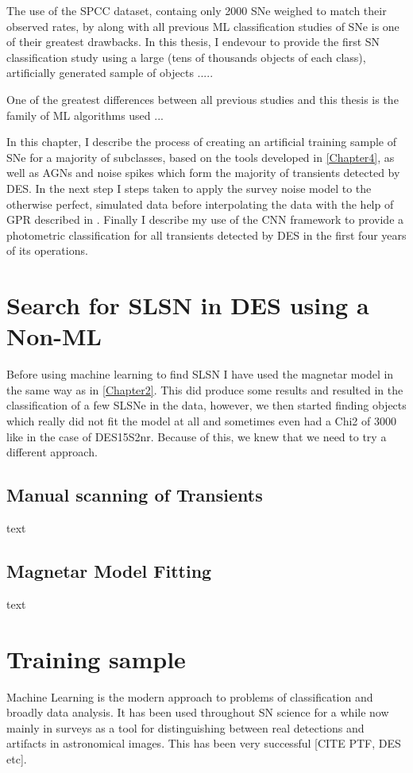 The use of the SPCC dataset, containg only 2000 SNe weighed to match their observed rates, by \citet{Lochner2016} along with all previous ML classification studies of SNe is one of their greatest drawbacks. In this thesis, I endevour to provide the first SN classification study using a large (tens of thousands objects of each class), artificially generated sample of objects .....

One of the greatest differences between all previous studies and this thesis is the family of ML algorithms used ...


In this chapter, I describe the process of creating an artificial training sample of SNe for a majority of subclasses, based on the tools developed in \cref{Chapter4}, as well as AGNs and noise spikes which form the majority of transients detected by DES. In the next step I steps taken to apply the survey noise model to the otherwise perfect, simulated data before interpolating the data with the help of GPR described in . Finally I describe my use of the CNN framework to provide a photometric classification for all transients detected by DES in the first four years of its operations.


\section{Search for SLSN in DES using a Non-ML}
Before using machine learning to find SLSN I have used the magnetar model in the same way as in \cref{Chapter2}. This did produce some results and resulted in the classification of a few SLSNe in the data, however, we then started finding objects which really did not fit the model at all and sometimes even had a Chi2 of 3000 like in the case of DES15S2nr. Because of this, we knew that we need to try a different approach.

\subsection{Manual scanning of Transients}
text
\subsection{Magnetar Model Fitting}
text

\section{Training sample}
Machine Learning is the modern approach to problems of classification and broadly data analysis. It has been used throughout SN science for a while now mainly in surveys as a tool for distinguishing between real detections and artifacts in astronomical images. This has been very successful [CITE PTF, DES etc].

